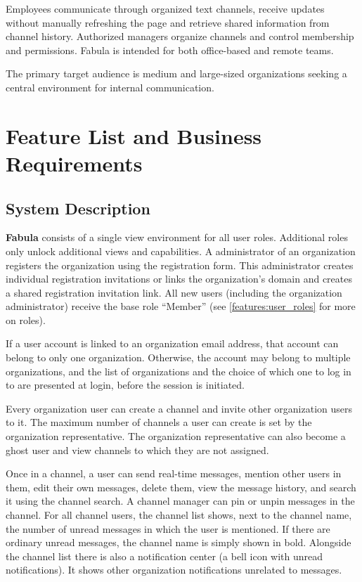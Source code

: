 \documentclass[
    english, %
]{VUMIFPSkursinis}
\begin{document}
Employees communicate through organized text channels, receive updates without manually refreshing the page and retrieve shared information from channel history. Authorized managers organize channels and control membership and permissions. Fabula is intended for both office-based and remote teams.

The primary target audience is medium and large-sized organizations seeking a central environment for internal communication.

\section{Feature List and Business Requirements}

\subsection{System Description}

\textbf{Fabula} consists of a single view environment for all user roles. Additional roles only unlock additional views and capabilities. A administrator of an organization registers the organization using the registration form. This administrator creates individual registration invitations or links the organization's domain and creates a shared registration invitation link. All new users (including the organization administrator) receive the base role “Member” (see \ref{features:user_roles} for more on roles).

If a user account is linked to an organization email address, that account can belong to only one organization. Otherwise, the account may belong to multiple organizations, and the list of organizations and the choice of which one to log in to are presented at login, before the session is initiated.

Every organization user can create a channel and invite other organization users to it. The maximum number of channels a user can create is set by the organization representative. The organization representative can also become a ghost user and view channels to which they are not assigned.

Once in a channel, a user can send real-time messages, mention other users in them, edit their own messages, delete them, view the message history, and search it using the channel search. A channel manager can pin or unpin messages in the channel. For all channel users, the channel list shows, next to the channel name, the number of unread messages in which the user is mentioned. If there are ordinary unread messages, the channel name is simply shown in bold. Alongside the channel list there is also a notification center (a bell icon with unread notifications). It shows other organization notifications unrelated to messages.
\end{document}

